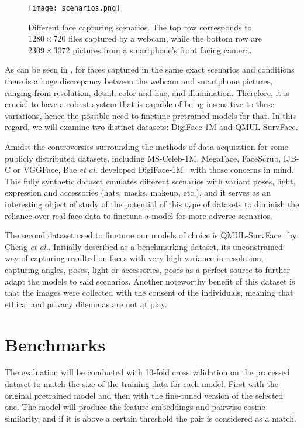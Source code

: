 \documentclass[class=report, crop=false, a4paper, 12pt]{standalone}
\begin{document}
\begin{figure}[H]
  \centering
  \texttt{[image: scenarios.png]}
  \caption{Different face capturing scenarios. The top row corresponds to $1280\times720$ files captured by a webcam, while the bottom row are $2309\times3072$ pictures from a smartphone's front facing camera.}
  \label{fig:scenarios}
\end{figure}

As can be seen in , for faces captured in the same exact scenarios and conditions there is a huge discrepancy between the webcam and smartphone pictures, ranging from resolution, detail, color and hue, and illumination. Therefore, it is crucial to have a robust system that is capable of being insensitive to these variations, hence the possible need to finetune pretrained models for that. In this regard, we will examine two distinct datasets: DigiFace-1M and QMUL-SurvFace.
\par Amidst the controversies surrounding the methods of data acquisition for some publicly distributed datasets, including MS-Celeb-1M, MegaFace, FaceScrub, IJB-C or VGGFace, Bae \textit{et al.} developed DigiFace-1M~\autocite{baeDigiFace1MMillionDigital2023} with those concerns in mind. This fully synthetic dataset emulates different scenarios with variant poses, light, expression and accessories (hats, masks, makeup, etc.), and it serves as an interesting object of study of the potential of this type of datasets to diminish the reliance over real face data to finetune a model for more adverse scenarios.
\par The second dataset used to finetune our models of choice is QMUL-SurvFace~\autocite{chengSurveillanceFaceRecognition2018} by Cheng \textit{et al.}. Initially described as a benchmarking dataset, its unconstrained way of capturing resulted on faces with very high variance in resolution, capturing angles, poses, light or accessories, poses as a perfect source to further adapt the models to said scenarios. Another noteworthy benefit of this dataset is that the images were collected with the consent of the individuals, meaning that ethical and privacy dilemmas are not at play.

\section{Benchmarks}
\par The evaluation will be conducted with 10-fold cross validation on the processed dataset to match the size of the training data for each model. First with the original pretrained model and then with the fine-tuned version of the selected one. The model will produce the feature embeddings and pairwise cosine similarity, and if it is above a certain threshold the pair is considered as a match. 
\end{document}

